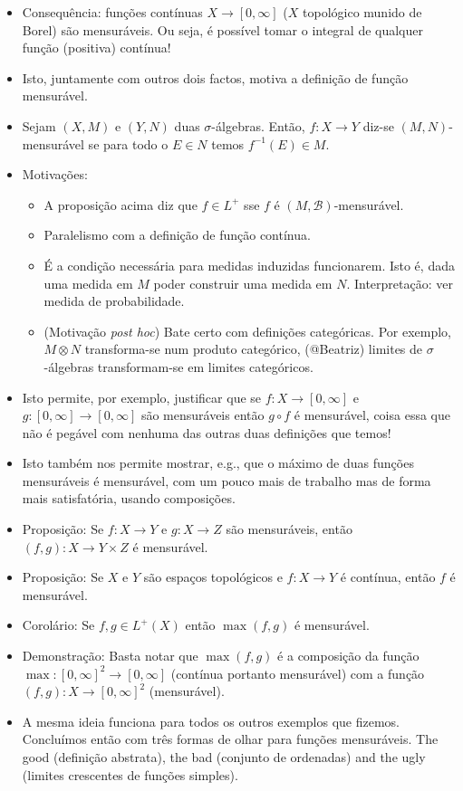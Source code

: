 \documentclass{article}
\begin{document}
\begin{itemize}
\item Consequência: funções contínuas $X \to [0,\infty]$ ($X$ topológico munido de Borel) são mensuráveis. Ou seja, é possível tomar o integral de qualquer função (positiva) contínua!
\item Isto, juntamente com outros dois factos, motiva a definição de função mensurável.
\item Sejam $(X,M)$ e $(Y,N)$ duas $\sigma$-álgebras. Então, $f: X \to Y$ diz-se $(M,N)$-mensurável se para todo o $E \in N$ temos $f^{-1}(E) \in M$.
\item Motivações:
\begin{itemize}
\item A proposição acima diz que $f \in L^+$ sse $f$ é $(M,\mathcal B)$-mensurável.
\item Paralelismo com a definição de função contínua.
\item É a condição necessária para medidas induzidas funcionarem. Isto é, dada uma medida em $M$ poder construir uma medida em $N$. Interpretação: ver medida de probabilidade.
\item (Motivação \textit{post hoc}) Bate certo com definições categóricas. Por exemplo, $M \otimes N$ transforma-se num produto categórico, (@Beatriz) limites de $\sigma$-álgebras transformam-se em limites categóricos. 
\end{itemize}
\item Isto permite, por exemplo, justificar que se $f : X \to [0,\infty]$ e $g : [0,\infty] \to [0,\infty]$ são mensuráveis então $g \circ f$ é mensurável, coisa essa que não é pegável com nenhuma das outras duas definições que temos!
\item Isto também nos permite mostrar, e.g., que o máximo de duas funções mensuráveis é mensurável, com um pouco mais de trabalho mas de forma mais satisfatória, usando composições.
\item Proposição: Se $f : X \to Y$ e $g : X \to Z$ são mensuráveis, então $(f,g) : X \to Y \times Z$ é mensurável.
\item Proposição: Se $X$ e $Y$ são espaços topológicos e $f : X \to Y$ é contínua, então $f$ é mensurável.
\item Corolário: Se $f, g \in L^+(X)$ então $\max(f,g)$ é mensurável.
\item Demonstração: Basta notar que $\max(f,g)$ é a composição da função $\max : [0,\infty]^2 \to [0,\infty]$ (contínua portanto mensurável) com a função $(f,g) : X \to [0,\infty]^2$ (mensurável).
\item A mesma ideia funciona para todos os outros exemplos que fizemos. Concluímos então com três formas de olhar para funções mensuráveis. The good (definição abstrata), the bad (conjunto de ordenadas) and the ugly (limites crescentes de funções simples).

\end{itemize}
\end{document}
